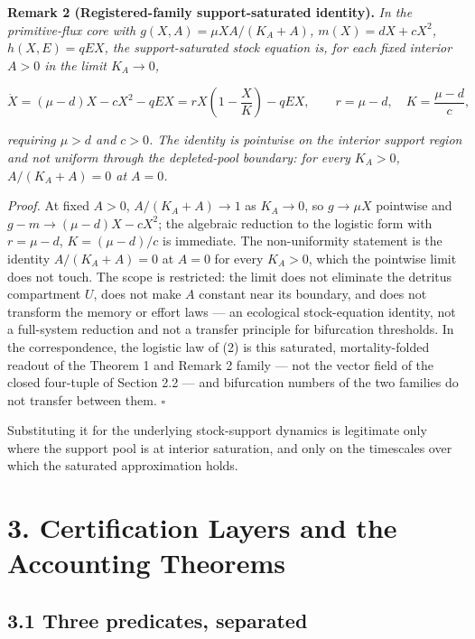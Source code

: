 \documentclass[11pt]{article}
\begin{document}
\textbf{Remark 2 (Registered-family support-saturated identity).} \emph{In the primitive-flux core with \(g(X,A) = \mu XA/(K_A + A)\), \(m(X) = dX + cX^2\), \(h(X,E) = qEX\), the support-saturated stock equation is, for each fixed interior \(A > 0\) in the limit \(K_A \to 0\),} 

$$\dot X = (\mu - d)X - cX^2 - qEX = rX\left(1 - \frac{X}{K}\right) - qEX, \qquad r = \mu - d, \quad K = \frac{\mu - d}{c},$$

 \emph{requiring \(\mu > d\) and \(c > 0\). The identity is pointwise on the interior support region and not uniform through the depleted-pool boundary: for every \(K_A > 0\), \(A/(K_A + A) = 0\) at \(A = 0\).}

\emph{Proof.} At fixed \(A > 0\), \(A/(K_A + A) \to 1\) as \(K_A \to 0\), so \(g \to \mu X\) pointwise and \(g - m \to (\mu - d)X - cX^2\); the algebraic reduction to the logistic form with \(r = \mu - d\), \(K = (\mu - d)/c\) is immediate. The non-uniformity statement is the identity \(A/(K_A + A) = 0\) at \(A = 0\) for every \(K_A > 0\), which the pointwise limit does not touch. The scope is restricted: the limit does not eliminate the detritus compartment \(U\), does not make \(A\) constant near its boundary, and does not transform the memory or effort laws --- an ecological stock-equation identity, not a full-system reduction and not a transfer principle for bifurcation thresholds. In the correspondence, the logistic law of (2) is this saturated, mortality-folded readout of the Theorem 1 and Remark 2 family --- not the vector field of the closed four-tuple of Section 2.2 --- and bifurcation numbers of the two families do not transfer between them. \(\square\)

Substituting it for the underlying stock-support dynamics is legitimate only where the support pool is at interior saturation, and only on the timescales over which the saturated approximation holds.

\vspace{0.8em}

\section*{3. Certification Layers and the Accounting Theorems}\label{3-certification-layers-and-the-accounting-theorems}

\subsection*{3.1 Three predicates, separated}\label{31-three-predicates-separated}
\end{document}
